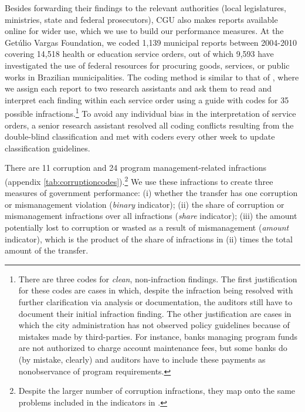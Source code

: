 \documentclass[11pt]{article}
\begin{document}
Besides forwarding their findings to the relevant authorities (local legislatures, ministries, state and federal prosecutors), CGU also makes reports available online for wider use, which we use to build our performance measures. At the Get\'ulio Vargas Foundation, we coded 1,139 municipal reports between 2004-2010 covering 14,518 health or education service orders, out of which 9,593 have investigated the use of federal resources for procuring goods, services, or public works in Brazilian municipalities. The coding method is similar to that of \citet{FerrazExposingCorruptPoliticians2008b}, where we assign each report to two research assistants and ask them to read and interpret each finding within each service order using a guide with codes for 35 possible infractions.\footnote{There are three codes for \emph{clean}, non-infraction findings. The first justification for these codes are cases in which, despite the infraction being resolved with further clarification via analysis or documentation, the auditors still have to document their initial infraction finding. The other justification are cases in which the city administration has not observed policy guidelines because of mistakes made by third-parties. For instance, banks managing program funds are not authorized to charge account maintenance fees, but some banks do (by mistake, clearly) and auditors have to include these payments as nonobservance of program requirements.} To avoid any individual bias in the interpretation of service orders, a senior research assistant resolved all coding conflicts resulting from the double-blind classification and met with coders every other week to update classification guidelines.



There are 11 corruption and 24 program management-related infractions (appendix \ref{tab:corruptioncodes}).\footnote{Despite the larger number of corruption infractions, they map onto the same problems included in the indicators in \citet{FerrazExposingCorruptPoliticians2008b,FerrazElectoralAccountabilityCorruption2011a}.} We use these infractions to create three measures of government performance: (i) whether the transfer has one corruption or mismanagement violation (\emph{binary} indicator); (ii) the share of corruption or mismanagement infractions over all infractions (\emph{share} indicator); (iii) the amount potentially lost to corruption or wasted as a result of mismanagement (\emph{amount} indicator), which is the product of the share of infractions in (ii) times the total amount of the transfer.
\end{document}
